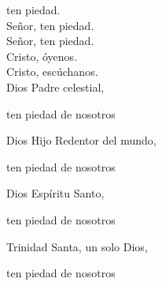 ten piedad.\\
Señor, ten piedad.\\
Señor, ten piedad.\\
Cristo, óyenos.\\
Cristo, escúchanos.\\
Dios Padre celestial,

\hfill ten piedad de nosotros

Dios Hijo Redentor del mundo,

\hfill ten piedad de nosotros

Dios Espíritu Santo,

\hfill ten piedad de nosotros

Trinidad Santa, un solo Dios,

\hfill ten piedad de nosotros

